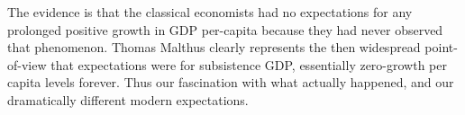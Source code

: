\documentclass[12pt]{article}
\numberwithin{equation}{section}
\begin{document}
		The evidence is that the classical economists had no expectations for any prolonged positive growth in GDP per-capita because they had never observed that phenomenon. Thomas Malthus clearly represents the then widespread point-of-view that expectations were for subsistence GDP, essentially zero-growth per capita levels forever. Thus our fascination with what actually happened, and our dramatically different modern expectations.
		

\end{document}
